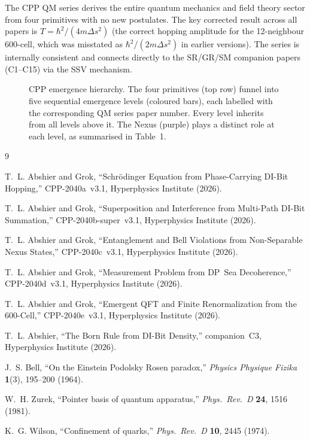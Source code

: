 \documentclass[11pt,a4paper]{article}
\begin{document}
The CPP QM series derives the entire quantum mechanics and field theory
sector from four primitives with no new postulates.  The key corrected
result across all papers is $T = \hbar^2/(4m\Delta s^2)$ (the correct
hopping amplitude for the 12-neighbour 600-cell, which was misstated
as $\hbar^2/(2m\Delta s^2)$ in earlier versions).  The series is
internally consistent and connects directly to the SR/GR/SM companion
papers (C1--C15) via the SSV mechanism.

\begin{figure}[H]
\centering

\caption{CPP emergence hierarchy.
  The four primitives (top row) funnel into five sequential emergence
  levels (coloured bars), each labelled with the corresponding QM
  series paper number.  Every level inherits from all levels above it.
  The Nexus (purple) plays a distinct role at each level, as
  summarised in Table~1.}
\label{fig:hierarchy}
\end{figure}


\begin{thebibliography}{9}

T.~L. Abshier and Grok,
``Schr\"{o}dinger Equation from Phase-Carrying DI-Bit Hopping,''
CPP-2040a~v3.1, Hyperphysics Institute (2026).

T.~L. Abshier and Grok,
``Superposition and Interference from Multi-Path DI-Bit Summation,''
CPP-2040b-super~v3.1, Hyperphysics Institute (2026).

T.~L. Abshier and Grok,
``Entanglement and Bell Violations from Non-Separable Nexus States,''
CPP-2040c~v3.1, Hyperphysics Institute (2026).

T.~L. Abshier and Grok,
``Measurement Problem from DP~Sea Decoherence,''
CPP-2040d~v3.1, Hyperphysics Institute (2026).

T.~L. Abshier and Grok,
``Emergent QFT and Finite Renormalization from the 600-Cell,''
CPP-2040e~v3.1, Hyperphysics Institute (2026).

T.~L. Abshier, ``The Born Rule from DI-Bit Density,''
companion~C3, Hyperphysics Institute (2026).

J.~S. Bell, ``On the Einstein Podolsky Rosen paradox,''
\textit{Physics Physique Fizika} \textbf{1}(3), 195--200 (1964).

W.~H. Zurek, ``Pointer basis of quantum apparatus,''
\textit{Phys.\ Rev.\ D} \textbf{24}, 1516 (1981).

K.~G. Wilson, ``Confinement of quarks,''
\textit{Phys.\ Rev.\ D} \textbf{10}, 2445 (1974).

\end{thebibliography}
\end{document}
